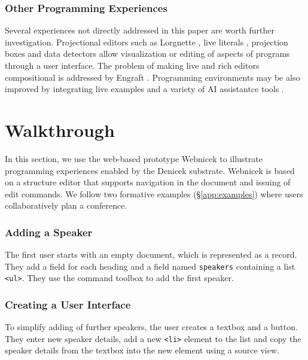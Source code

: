 \documentclass[sigconf,anonymous,screen]{acmart}
\newcommand*\circled[1]{\textnormal{\footnotesize\sffamily\bfseries\protect\tikz[baseline=(char.base)]{
  \node[shape=circle,fill=black,text=white,draw,inner sep=1pt] (char) {#1};}}}
\begin{document}
\subsubsection*{Other Programming Experiences}
Several experiences not directly addressed in this paper are worth further investigation.
Projectional editors such as Lorgnette \cite{gobert-2023-lorgnette},
live literals \cite{omar-2021-livelits}, projection boxes \cite{lerner-2020-boxes} and data detectors
\cite{nardi-1998-agents} allow visualization or editing of aspects of programs through a user interface.
The problem of making live and rich editors compositional is addressed by
Engraft \cite{horowitz-2023-engraft}. Programming environments may be also improved by integrating
live examples \cite{rauch-2019-babylonian} and a variety of AI assistantce
tools \cite{petricek-2023-aias,blinn-2024-llms,mcnutt-2023-nbai}.



\section{Walkthrough}
\label{sec:walk}

In this section, we use the web-based prototype Webnicek to illustrate programming
experiences enabled by the Denicek substrate. Webnicek is based on a structure
editor that supports navigation in the document and issuing of edit commands. We follow two
formative examples (\S\ref{app:examples}) where users collaboratively plan a conference.

\subsubsection*{\circled{A} Adding a Speaker}
The first user starts with an empty document, which is represented as a record. They add a field for
each heading and a field named {\small\Verb_speakers_} containing a list {\small\Verb_<ul>_}. They
use the command toolbox to add the first speaker.

\subsubsection*{\circled{B} Creating a User Interface} To simplify adding of
further speakers, the user creates a textbox and a button. They enter new speaker
details, add a new {\small\Verb_<li>_} element to the list and copy the speaker details
from the textbox into the new element using a source view.
\end{document}
